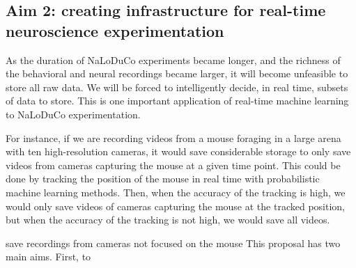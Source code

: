 \documentclass[12pt]{article}
\begin{document}
\subsection{Aim 2: creating infrastructure for real-time neuroscience
experimentation}

As the duration of NaLoDuCo experiments became longer, and the richness of the
behavioral and neural recordings became larger, it will become unfeasible to
store all raw data. We will be forced to intelligently decide, in real time,
subsets of data to store. This is one important application of real-time
machine learning to NaLoDuCo experimentation.

For instance, if we are recording videos from a mouse foraging in a large arena
with ten high-resolution cameras, it would save considerable storage to only
save videos from cameras capturing the mouse at a given time point. This could
be done by tracking the position of the mouse in real time with probabilistic
machine learning methods. Then, when the accuracy of the tracking is high, we would only save
videos of cameras capturing the mouse at the tracked position, but when the
accuracy of the tracking is not high, we would save all videos.

save recordings from cameras not focused on the mouse
This proposal has two main aims. First,
to 
\end{document}
